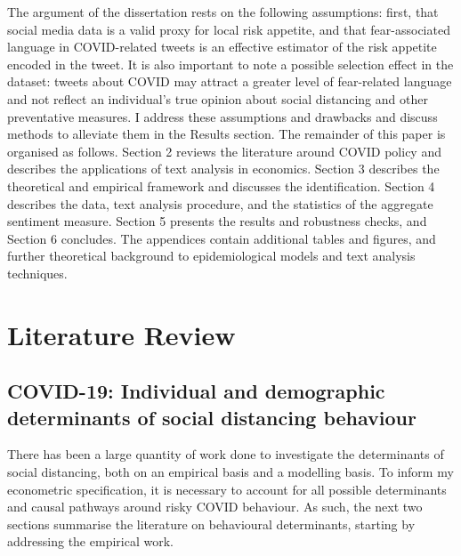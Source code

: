 \documentclass[12pt,a4]{article}
\begin{document}
The argument of the dissertation rests on the following assumptions: first, that social media data is a valid proxy for local risk appetite, and that fear-associated language in COVID-related tweets is an effective estimator of the risk appetite encoded in the tweet. It is also important to note a possible selection effect in the dataset: tweets about COVID may attract a greater level of fear-related language and not reflect an individual's true opinion about social distancing and other preventative measures. I address these assumptions and drawbacks and discuss methods to alleviate them in the Results section. The remainder of this paper is organised as follows. Section 2 reviews the literature around COVID policy and describes the applications of text analysis in economics. Section 3 describes the theoretical and empirical framework and discusses the identification. Section 4 describes the data, text analysis procedure, and the statistics of the aggregate sentiment measure. Section 5 presents the results and robustness checks, and Section 6 concludes. The appendices contain additional tables and figures, and further theoretical background to epidemiological models and text analysis techniques.


\section{Literature Review}
\subsection{COVID-19: Individual and demographic determinants of social distancing behaviour}
There has been a large quantity of work done to investigate the determinants of social distancing, both on an empirical basis and a modelling basis. To inform my econometric specification, it is necessary to account for all possible determinants and causal pathways around risky COVID behaviour. As such, the next two sections summarise the literature on behavioural determinants, starting by addressing the empirical work.
\end{document}
